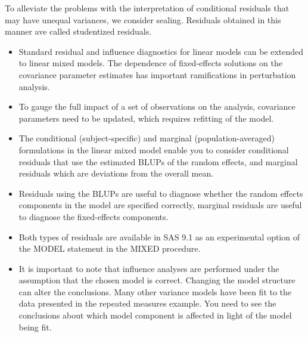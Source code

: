 \documentclass[12pt, a4paper]{report}
\theoremstyle{plain}
\theoremstyle{definition}
\theoremstyle{remark}
\begin{document}
To alleviate the problems with the interpretation of conditional residuals that may have unequal variances, we consider sealing.
Residuals obtained in this manner ave called studentized residuals.

\begin{itemize}
	\item Standard residual and inﬂuence diagnostics for linear models can be extended to linear mixed models. The dependence of ﬁxed-effects solutions on the covariance parameter estimates has important ramiﬁcations in perturbation analysis. 
	\item To gauge the full impact of a set of observations on the analysis, covariance parameters need to be updated, which requires reﬁtting of the model. 
	
	\item The conditional (subject-speciﬁc) and marginal (population-averaged) formulations in the linear mixed model enable you to consider conditional residuals that use the estimated BLUPs of the random effects, and marginal residuals which are deviations from the overall mean. 
	\item Residuals using the BLUPs are useful to diagnose whether the random effects components in the model are speciﬁed correctly, marginal residuals are useful to diagnose the ﬁxed-effects components. 
	\item Both types of residuals are available in SAS 9.1 as an experimental option of the MODEL statement in the MIXED procedure.
	
	\item It is important to note that influence analyses are performed under the assumption that the chosen model is correct. Changing the model structure can alter the conclusions. Many other variance models have been ﬁt to the data presented in the repeated measures example. You need to see the conclusions about which model component is affected in light of the model being fit.
\end{itemize}
\end{document}
